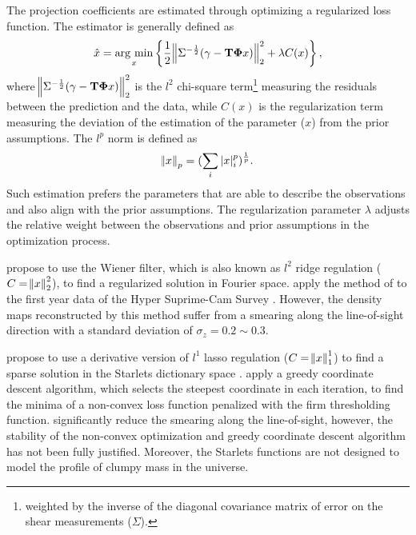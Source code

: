 \documentclass[twocolumn]{aastex62}
\newcommand{\argmin}{\mathop{\rm arg~min}\limits}
\begin{document}
The projection coefficients are estimated through optimizing a regularized loss function. The estimator is
generally defined as
\begin{equation}
\hat{x}=\argmin_{x} \left\{ \frac{1}{2}\norm{\Sigma^{-\frac{1}{2}}(\gamma- \mathbf{T\Phi} x)}_2^2+ \lambda C(x) \right\},
\end{equation}
where $\norm{\Sigma^{-\frac{1}{2}}(\gamma - \mathbf{T\Phi} x)}_2^2$ is the $l^2$ chi-square term\footnote{weighted by 
the inverse of the diagonal covariance matrix of error on the shear measurements ($\Sigma$).} measuring
the residuals between the prediction and the data, while $C(x)$ is the regularization term measuring the deviation of
the estimation of the parameter ($x$) from the prior assumptions. The $l^p$ norm is defined as
\begin{equation}
\norm{x}_p=(\sum_{i} |x|^p_i)^{\frac{1}{p}}.
\end{equation}
Such estimation prefers the parameters that are able to describe the observations and also align with the prior assumptions. 
The regularization parameter $\lambda$ adjusts the relative weight between the observations and prior assumptions in the 
optimization process.

\citet{LSS-massMap-Wiener-Simon2009} propose to use the Wiener filter, which is also known as $l^2$ ridge regulation 
($C=\norm{x}^2_2$), to find a regularized solution in Fourier space. \citet{HSC1-massMaps} apply the method of 
\citet{LSS-massMap-Wiener-Simon2009} to the first year data of the Hyper Suprime-Cam Survey \citep{HSC1-data}. 
However, the density maps reconstructed by this method suffer from a smearing along the line-of-sight direction with 
a standard deviation of $\sigma_z=0.2 \sim 0.3$.

\citet{LSS-massMap-Glimpse3D-Leonard2014} propose to use a derivative version of $l^1$ lasso regulation ($C=\norm{x}^1_1$) 
to find a sparse solution in the Starlets dictionary space \citep{Starlet-Starck2015}. \citet{LSS-massMap-Glimpse3D-Leonard2014}
apply a greedy coordinate descent algorithm, which selects the steepest coordinate in each iteration, to find the minima 
of a non-convex loss function penalized with the firm thresholding function. \citet{LSS-massMap-Glimpse3D-Leonard2014} 
significantly reduce the smearing along the line-of-sight, however, the stability of the non-convex optimization and
greedy coordinate descent algorithm has not been fully justified. Moreover, the Starlets functions are not designed to 
model the profile of clumpy mass in the universe. 
\end{document}
